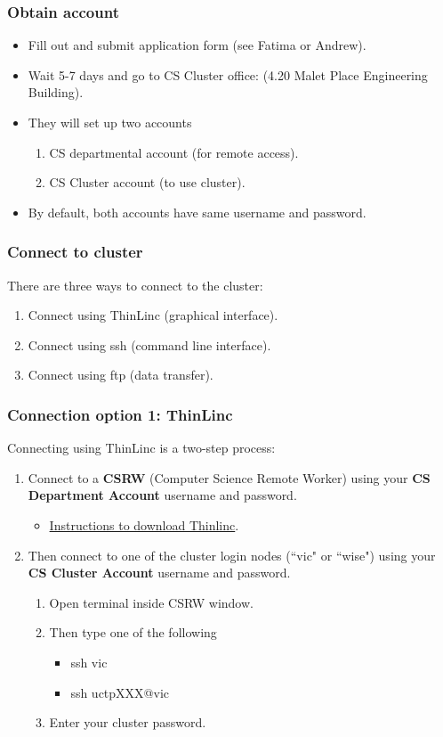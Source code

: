 \documentclass{beamer}
\begin{document}
\begin{frame}
\frametitle{Obtain account}
\begin{itemize}
\item Fill out and submit application form (see Fatima or Andrew).
\item Wait 5-7 days and go to CS Cluster office: (4.20 Malet Place Engineering Building).
\item They will set up two accounts
\begin{enumerate}
\item CS departmental account (for remote access).
\item CS Cluster account (to use cluster).
\end{enumerate}
\item By default, both accounts have same username and password.
\end{itemize}
\end{frame}

\begin{frame}
\frametitle{Connect to cluster}

There are three ways to connect to the cluster:
\begin{enumerate}
\item Connect using ThinLinc (graphical interface).
\item Connect using ssh (command line interface).
\item Connect using ftp (data transfer).
\end{enumerate}
\end{frame}

\begin{frame}
\frametitle{Connection option 1: ThinLinc}

Connecting using ThinLinc is a two-step process:
\begin{enumerate}
\item Connect to a \textbf{CSRW} (Computer Science Remote Worker) using your \textbf{CS Department Account} username and password.
\begin{itemize}
\item \textcolor{blue}{\href{http://www.cs.ucl.ac.uk/index.php?id=7404}{Instructions to download Thinlinc}}.
\end{itemize}
\item Then connect to one of the cluster login nodes (``vic" or ``wise") using your \textbf{CS Cluster Account} username and password.
\begin{enumerate}
\item Open terminal inside CSRW window. 
\item Then type one of the following
\begin{itemize}
\item ssh vic
\item ssh uctpXXX@vic
\end{itemize}
\item Enter your cluster password.
\end{enumerate}
\end{enumerate}
\end{frame}
\end{document}

